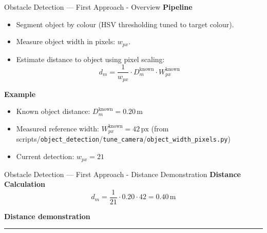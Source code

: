 \documentclass[aspectratio=169,12pt]{beamer}
\begin{document}
\begin{frame}[t]{Obstacle Detection — First Approach - Overview}
  \vspace*{-0.3em}
  \textbf{Pipeline}
  \begin{itemize}\setlength{\itemsep}{0.35em}
    \item Segment object by colour (HSV thresholding tuned to target colour).
    \item Measure object width in pixels: \(w_{px}\).
    \item Estimate distance to object using pixel scaling:
      \[
        d_{m} = \frac{1}{w_{px}} \cdot D^{\text{known}}_{m} \cdot {W^{\text{known}}_{px}}
      \]
  \end{itemize}

  \vspace{0.3em}
  \textbf{Example}
  \begin{itemize}\setlength{\itemsep}{0.35em}
    \item Known object distance: \(D^{\text{known}}_{m} = 0.20\,\text{m}\)
    \item Measured reference width: \(W^{\text{known}}_{px} = 42\,\text{px}\)  
          (from scripts/\texttt{object\_detection}/\texttt{tune\_camera}/\texttt{object\_width\_pixels.py})
    \item Current detection: \(w_{px} = 21\)
  \end{itemize}
\end{frame}

\begin{frame}[t]{Obstacle Detection — First Approach - Distance Demonstration}
  \vspace*{-0.3em}
  \textbf{Distance Calculation}
  \[
    d_{m} = \frac{1}{21} \cdot 0.20 \cdot 42 = 0.40\,\text{m}
  \]

  \vspace{0.6em}
  \textbf{Distance demonstration}
  \vspace{1em}
  
  \centering
  \rule{0pt}{6cm}\rule{0.85\linewidth}{0pt} %
  
\end{frame}
\end{document}
